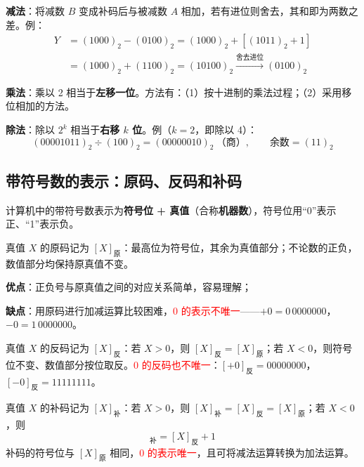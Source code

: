 \textbf{减法}：将减数 $B$ 变成补码后与被减数 $A$ 相加，若有进位则舍去，其和即为两数之差。例：
\begin{equation}
	\begin{aligned}
		Y &= (1000)_{2}-(0100)_{2}=(1000)_{2}+\left[(1011)_{2}+1\right] \\
		&= (1000)_{2}+(1100)_{2}=(10100)_{2}
		\xrightarrow{\text{舍去进位}}(0100)_{2}
	\end{aligned}
	\label{eq:数制:减法用补码}
\end{equation}

\textbf{乘法}：乘以 2 相当于\textbf{左移一位}。方法有：（1）按十进制的乘法过程；（2）采用移位相加的方法。

\textbf{除法}：除以 $2^{k}$ 相当于\textbf{右移 $k$ 位}。例（$k=2$，即除以 4）：
\begin{equation}
	(00001011)_{2}\div(100)_{2}=(00000010)_{2}\ \text{（商）},\qquad
	\text{余数}=(11)_{2}
	\label{eq:数制:除法}
\end{equation}

\subsection{带符号数的表示：原码、反码和补码}
\label{sec:带符号数的表示}

计算机中的带符号数表示为\textbf{符号位 + 真值}（合称\textbf{机器数}），符号位用“0”表示正、“1”表示负。

\begin{definition}[原码]
	\label{def:原码}
	真值 $X$ 的原码记为 $[X]_{\text{原}}$：最高位为符号位，其余为真值部分；不论数的正负，数值部分均保持原真值不变。

	\textbf{优点}：正负号与原真值之间的对应关系简单，容易理解；

	\textbf{缺点}：用原码进行加减运算比较困难，\textcolor{red}{0 的表示不唯一}——$+0=0\,0000000$，$-0=1\,0000000$。
\end{definition}

\begin{definition}[反码]
	\label{def:反码}
	真值 $X$ 的反码记为 $[X]_{\text{反}}$：若 $X>0$，则 $[X]_{\text{反}}=[X]_{\text{原}}$；若 $X<0$，则符号位不变、数值部分按位取反。\textcolor{red}{0 的反码也不唯一}：$[+0]_{\text{反}}=00000000$，$[-0]_{\text{反}}=11111111$。
\end{definition}

\begin{definition}[补码]
	\label{def:补码}
	真值 $X$ 的补码记为 $[X]_{\text{补}}$：若 $X>0$，则 $[X]_{\text{补}}=[X]_{\text{反}}=[X]_{\text{原}}$；若 $X<0$，则
	\begin{equation}
		[X]_{\text{补}}=[X]_{\text{反}}+1
		\label{eq:补码:定义}
	\end{equation}
	补码的符号位与 $[X]_{\text{原}}$ 相同，\textcolor{red}{0 的表示唯一}，且可将减法运算转换为加法运算。
\end{definition}


